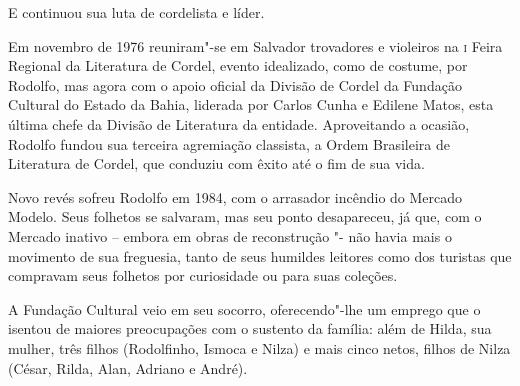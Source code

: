 E continuou sua luta de cordelista e líder.

Em novembro de 1976 reuniram"-se em Salvador trovadores e violeiros na
\textsc{i} Feira Regional da Literatura de Cordel, evento idealizado, como de
costume, por Rodolfo, mas agora com o apoio oficial da Divisão de
Cordel da Fundação Cultural do Estado da Bahia, liderada por Carlos
Cunha e Edilene Matos, esta última chefe da Divisão de Literatura da
entidade. Aproveitando a ocasião, Rodolfo fundou sua terceira
agremiação classista, a Ordem Brasileira de Literatura de Cordel, que
conduziu com êxito até o fim de sua vida.

Novo revés sofreu Rodolfo em 1984, com o arrasador incêndio do Mercado
Modelo. Seus folhetos se salvaram, mas seu ponto desapareceu, já que,
com o Mercado inativo -- embora em obras de reconstrução "- não havia
mais o movimento de sua freguesia, tanto de seus humildes leitores como
dos turistas que compravam seus folhetos por curiosidade ou para suas
coleções.

A Fundação Cultural veio em seu socorro, oferecendo"-lhe um emprego
que o isentou de maiores preocupações com o sustento da família: além
de Hilda, sua mulher, três filhos (Rodolfinho, Ismoca e Nilza) e mais
cinco netos, filhos de Nilza (César, Rilda, Alan, Adriano e André).

